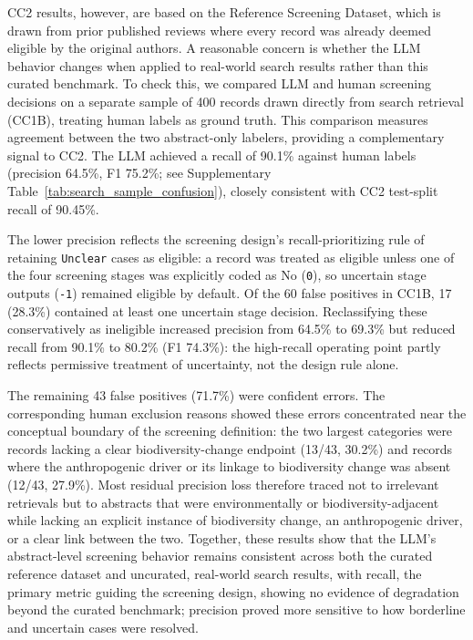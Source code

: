 \documentclass[12pt]{article}
\begin{document}
CC2 results, however, are based on the Reference Screening Dataset, which is drawn from prior published reviews where every record was already deemed eligible by the original authors. A reasonable concern is whether the LLM behavior changes when applied to real-world search results rather than this curated benchmark. To check this, we compared LLM and human screening decisions on a separate sample of 400 records drawn directly from search retrieval (CC1B), treating human labels as ground truth. This comparison measures agreement between the two abstract-only labelers, providing a complementary signal to CC2. The LLM achieved a recall of 90.1\% against human labels (precision 64.5\%, F1 75.2\%; see Supplementary Table~\ref{tab:search_sample_confusion}), closely consistent with CC2 test-split recall of 90.45\%.

The lower precision reflects the screening design's recall-prioritizing rule of retaining \texttt{Unclear} cases as eligible: a record was treated as eligible unless one of the four screening stages was explicitly coded as No (\texttt{0}), so uncertain stage outputs (\texttt{-1}) remained eligible by default. Of the 60 false positives in CC1B, 17 (28.3\%) contained at least one uncertain stage decision. Reclassifying these conservatively as ineligible increased precision from 64.5\% to 69.3\% but reduced recall from 90.1\% to 80.2\% (F1 74.3\%): the high-recall operating point partly reflects permissive treatment of uncertainty, not the design rule alone.

The remaining 43 false positives (71.7\%) were confident errors. The corresponding human exclusion reasons showed these errors concentrated near the conceptual boundary of the screening definition: the two largest categories were records lacking a clear biodiversity-change endpoint (13/43, 30.2\%) and records where the anthropogenic driver or its linkage to biodiversity change was absent (12/43, 27.9\%). Most residual precision loss therefore traced not to irrelevant retrievals but to abstracts that were environmentally or biodiversity-adjacent while lacking an explicit instance of biodiversity change, an anthropogenic driver, or a clear link between the two. Together, these results show that the LLM's abstract-level screening behavior remains consistent across both the curated reference dataset and uncurated, real-world search results, with recall, the primary metric guiding the screening design, showing no evidence of degradation beyond the curated benchmark; precision proved more sensitive to how borderline and uncertain cases were resolved.
\end{document}
